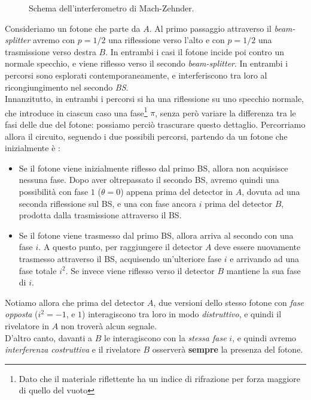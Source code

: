 \documentclass[../../InformazioneQuantistica.tex]{subfiles}
\begin{document}
\begin{figure}[H]
\centering

\caption{Schema dell'interferometro di Mach-Zehnder.
\label{fig:interferometro}}
\end{figure}

Consideriamo un fotone che parte da $A$. Al primo passaggio attraverso il \textit{beam-splitter} avremo con $p=1/2$ una riflessione verso l'alto e con $p=1/2$ una trasmissione verso destra $B$. In entrambi i casi il fotone incide poi contro un normale specchio, e viene riflesso verso il secondo \textit{beam-splitter}. In \MQ entrambi i percorsi sono esplorati contemporaneamente, e interferiscono tra loro al ricongiungimento nel secondo \textit{BS}.\\

Innanzitutto, in entrambi i percorsi si ha una riflessione su uno specchio normale, che introduce in ciascun caso una fase\footnote{Dato che il materiale riflettente ha un indice di rifrazione per forza maggiore di quello del vuoto} $\pi$, senza però variare la differenza tra le fasi delle due  del fotone: possiamo perciò trascurare questo dettaglio. Percorriamo allora il circuito, seguendo i due possibili percorsi, partendo da un fotone che inizialmente è :  
\begin{itemize}
\item Se il fotone viene inizialmente riflesso dal primo BS, allora non acquisisce nessuna fase. Dopo aver oltrepassato il secondo BS, avremo quindi una possibilità con fase $1$ ($\theta = 0$) appena prima del detector in $A$, dovuta ad una seconda riflessione sul BS, e una con fase ancora $i$ prima del detector $B$, prodotta dalla trasmissione attraverso il BS.
\item Se il fotone viene trasmesso dal primo BS, allora arriva al secondo con una fase $i$. A questo punto, per raggiungere il detector $A$ deve essere nuovamente trasmesso attraverso il BS, acquisendo un'ulteriore fase $i$ e arrivando ad una fase totale $i^2$. Se invece viene riflesso verso il detector $B$ mantiene la sua fase di $i$.
\end{itemize}
Notiamo allora che prima del detector $A$, due versioni dello stesso fotone con \textit{fase opposta} ($i^2 = -1$, e $1$) interagiscono tra loro in modo \textit{distruttivo}, e quindi il rivelatore in $A$ non troverà alcun segnale.\\
D'altro canto, davanti a $B$ le  interagiscono con la \textit{stessa fase} $i$, e quindi avremo \textit{interferenza costruttiva} e il rivelatore $B$ osserverà \textbf{sempre} la presenza del fotone.\\
\end{document}
